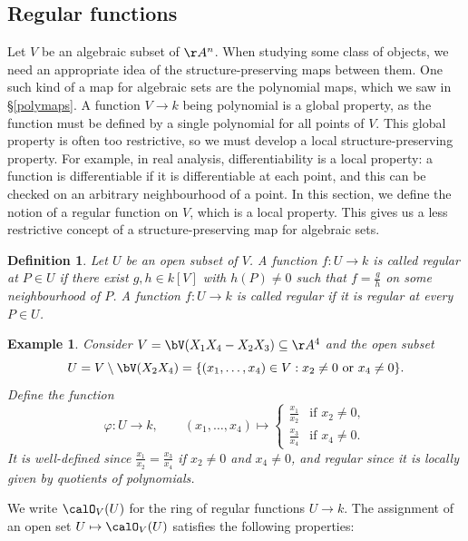 \documentclass[12pt]{amsart}
\theoremstyle{plain}
\newtheorem{definition}[theorem]{Definition}
\newtheorem{example}[theorem]{Example}
\begin{document}
\subsection{Regular functions}
Let $V$ be an algebraic subset of $\AA^n$.
When studying some class of objects, we need an appropriate idea of the structure-preserving maps between them.
One such kind of a map for algebraic sets are the polynomial maps, which we saw in \S \ref{polymaps}.
A function $V \to k$ being polynomial is a global property, as the function must be defined by a single polynomial for all points of $V$.
This global property is often too restrictive, so we must develop a local structure-preserving property.
For example, in real analysis, differentiability is a local property: a function is differentiable if it is differentiable at each point, and this can be checked on an arbitrary neighbourhood of a point.
In this section, we define the notion of a regular function on $V$, which is a local property.
This gives us a less restrictive concept of a structure-preserving map for algebraic sets.

\begin{definition}
Let $U$ be an open subset of $V$.
A function $f : U \to k$ is called regular at $P \in U$ if there exist $g, h \in k[V]$ with $h(P)\ne 0$ such that $f = \frac{g}{h}$ on some neighbourhood of $P$.
A function $f:U\to k$ is called regular if it is regular at every $P \in U$.
\end{definition}

\begin{example}
Consider $V = \bV(X_1 X_4 - X_2 X_3) \subseteq \AA^4$ and the open subset
$$U = V \setminus \bV(X_2 X_4) = \{(x_1, \ldots, x_4) \in V : x_2 \ne 0 \text{ or } x_4 \ne 0\}.$$
Define the function
$$\varphi : U \to k, \qquad
(x_1, \ldots, x_4) \mapsto 
\begin{cases} 
	\frac{x_1}{x_2} & \text{if } x_2 \ne 0, \\ 
	\frac{x_3}{x_4} & \text{if } x_4 \ne 0. 
\end{cases}$$
It is well-defined since $\frac{x_1}{x_2} = \frac{x_3}{x_4}$ if $x_2 \ne 0$ and $x_4 \ne 0$, and regular since it is locally given by quotients of polynomials.
\end{example}

We write $\calO_V(U)$ for the ring of regular functions $U \to k$.
The assignment of an open set $U \mapsto \calO_V(U)$ satisfies the following properties:
\end{document}
